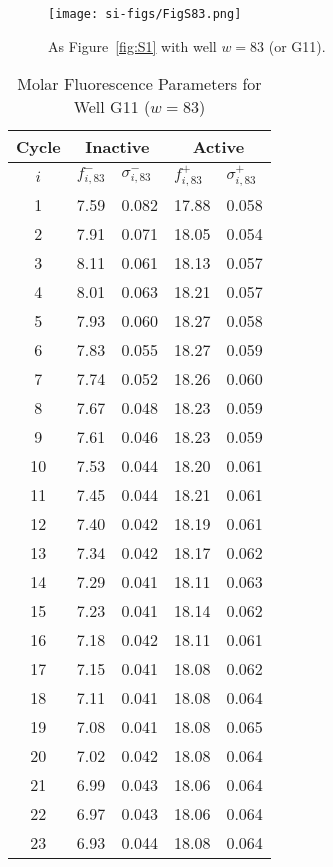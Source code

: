                 \begin{figure}
                    \centering
                    \texttt{[image: si-figs/FigS83.png]}
                    \caption{
                        As Figure~\ref{fig:S1} with well $w=83$ (or G11).
                    }
                \end{figure}
                \clearpage
    \begin{table}
        \caption{Molar Fluorescence Parameters for Well G11 ($w=83$)}
        \centering
        \begin{tabular}{c|ll|ll}
            Cycle & \multicolumn{2}{c|}{Inactive} & \multicolumn{2}{c}{Active} \\
            \hline
            $i$ & $f_{i,83}^{-}$ & $\sigma_{i,83}^{-}$ &  $f_{i,83}^{+}$ & $\sigma_{i,83}^{+}$ \\
            \hline
    1 & 7.59 & 0.082 & 17.88 & 0.058 \\
2 & 7.91 & 0.071 & 18.05 & 0.054 \\
3 & 8.11 & 0.061 & 18.13 & 0.057 \\
4 & 8.01 & 0.063 & 18.21 & 0.057 \\
5 & 7.93 & 0.060 & 18.27 & 0.058 \\
6 & 7.83 & 0.055 & 18.27 & 0.059 \\
7 & 7.74 & 0.052 & 18.26 & 0.060 \\
8 & 7.67 & 0.048 & 18.23 & 0.059 \\
9 & 7.61 & 0.046 & 18.23 & 0.059 \\
10 & 7.53 & 0.044 & 18.20 & 0.061 \\
11 & 7.45 & 0.044 & 18.21 & 0.061 \\
12 & 7.40 & 0.042 & 18.19 & 0.061 \\
13 & 7.34 & 0.042 & 18.17 & 0.062 \\
14 & 7.29 & 0.041 & 18.11 & 0.063 \\
15 & 7.23 & 0.041 & 18.14 & 0.062 \\
16 & 7.18 & 0.042 & 18.11 & 0.061 \\
17 & 7.15 & 0.041 & 18.08 & 0.062 \\
18 & 7.11 & 0.041 & 18.08 & 0.064 \\
19 & 7.08 & 0.041 & 18.08 & 0.065 \\
20 & 7.02 & 0.042 & 18.08 & 0.064 \\
21 & 6.99 & 0.043 & 18.06 & 0.064 \\
22 & 6.97 & 0.043 & 18.06 & 0.064 \\
23 & 6.93 & 0.044 & 18.08 & 0.064 \\

\end{tabular}
\end{table}
